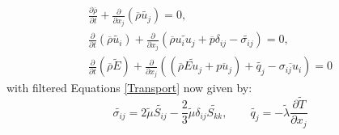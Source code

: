 \begin{equation} \label{NSE_favre_filtered}
\begin{split}
  \frac{\partial\overline{\rho}}{\partial t} + \frac{\partial }{\partial x_j} \left( \overline{\rho}\widetilde{ u_j} \right) = 0,  \\
  \frac{\partial}{\partial t} \left( \overline{\rho}\widetilde{ u_i }\right) + \frac{\partial}{\partial x_j} \left(\overline{\rho}\widetilde{ u_i u_j} + \overline{p }\delta_{ij} - \widetilde{\sigma_{ij}} \right) = 0,  \\
  \frac{\partial}{\partial t} \left( \overline{\rho}\widetilde{ E} \right) + \frac{\partial}{\partial x_j} \left(\left( \overline{\rho}\widetilde{ Eu_j}+\overline{p u_j} \right) + \widetilde{q_j} - \overline{\sigma_{ij} u_i}\right) = 0 
\end{split}
\end{equation}
with filtered Equations \eqref{Transport} now given by: 
\begin{equation} \label{filtered_trans}
  \widetilde{\sigma_{ij}} = 2\widetilde{\mu}\widetilde{ S_{ij}} - \frac{2}{3}\widetilde{\mu} \delta_{ij} \widetilde{ S_{kk}}, \quad \quad
  \widetilde{q_j} = -\widetilde{\lambda} \frac{\partial \widetilde{T}}{\partial x_j}
\end{equation}

